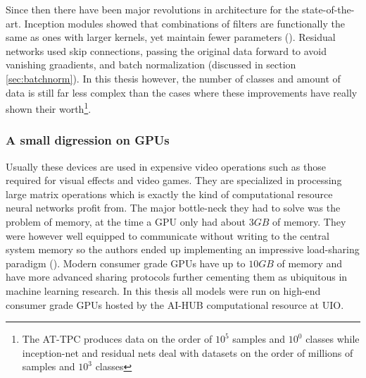 Since then there have been major revolutions in architecture for the state-of-the-art. Inception modules showed that combinations of filters are functionally the same as ones with larger kernels, yet maintain fewer parameters (\cite{Szegedy2014}). Residual networks used skip connections, passing the original data forward to avoid vanishing graadients, and batch normalization (discussed in section \ref{sec:batchnorm}). In this thesis however, the number of classes and amount of data is still far less complex than the cases where these improvements have really shown their worth\footnote{The AT-TPC produces data on the order of $10^5$ samples and $10^0$ classes while inception-net and residual nets deal with datasets on the order of millions of samples and $10^3$ classes}.

\subsubsection{A small digression on GPUs}
Usually these devices are used in expensive video operations such as those required for visual effects and video games. They are specialized in processing large matrix operations which is exactly the kind of computational resource neural networks profit from. The major bottle-neck they had to solve was the problem of memory, at the time a GPU only had about $3 GB$ of memory. They were however well equipped to communicate without writing to the central system memory so the authors ended up implementing an impressive load-sharing paradigm (\cite{Krizhevsky2012}). Modern consumer grade GPUs have up to $10 GB$ of memory and have more advanced sharing protocols further cementing them as ubiquitous in machine learning research. In this thesis all models were run on high-end consumer grade GPUs hosted by the AI-HUB computational resource at UIO.

